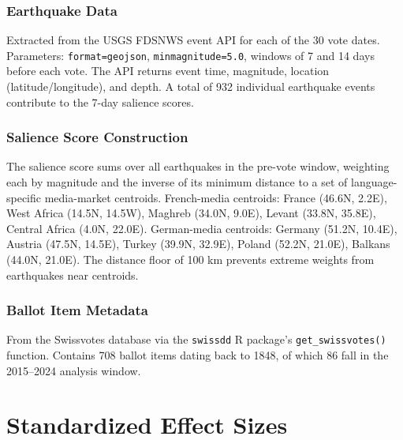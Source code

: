 \documentclass[12pt]{article}
\begin{document}
\subsubsection*{Earthquake Data} Extracted from the USGS FDSNWS event API for each of the 30 vote dates. Parameters: \texttt{format=geojson}, \texttt{minmagnitude=5.0}, windows of 7 and 14 days before each vote. The API returns event time, magnitude, location (latitude/longitude), and depth. A total of 932 individual earthquake events contribute to the 7-day salience scores.

\subsubsection*{Salience Score Construction} The salience score sums over all earthquakes in the pre-vote window, weighting each by magnitude and the inverse of its minimum distance to a set of language-specific media-market centroids. French-media centroids: France (46.6\textdegree N, 2.2\textdegree E), West Africa (14.5\textdegree N, 14.5\textdegree W), Maghreb (34.0\textdegree N, 9.0\textdegree E), Levant (33.8\textdegree N, 35.8\textdegree E), Central Africa (4.0\textdegree N, 22.0\textdegree E). German-media centroids: Germany (51.2\textdegree N, 10.4\textdegree E), Austria (47.5\textdegree N, 14.5\textdegree E), Turkey (39.9\textdegree N, 32.9\textdegree E), Poland (52.2\textdegree N, 21.0\textdegree E), Balkans (44.0\textdegree N, 21.0\textdegree E). The distance floor of 100 km prevents extreme weights from earthquakes near centroids.

\subsubsection*{Ballot Item Metadata} From the Swissvotes database via the \texttt{swissdd} R package's \texttt{get\_swissvotes()} function. Contains 708 ballot items dating back to 1848, of which 86 fall in the 2015--2024 analysis window.

\section{Standardized Effect Sizes}
\label{sec:sde}

{\small}
\end{document}
